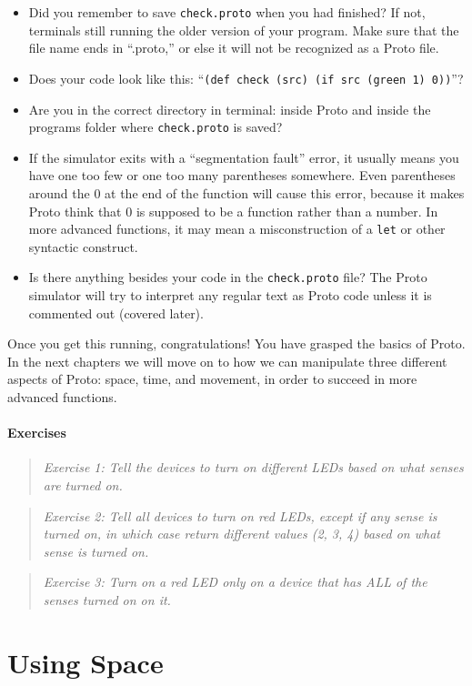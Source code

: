 \documentclass{article}
\newcommand\problem[1]{\begin{quote}{\em #1}\end{quote}}
\newcommand\var[1]{{\tt #1}}
\newcommand\qvar[1]{``{\tt #1}''}
\begin{document}
\begin{itemize}
\item Did you remember to save \var{check.proto} when you had
  finished? If not, terminals still running the older version of your
  program. Make sure that the file name ends in ``.proto,'' or else it
  will not be recognized as a Proto file.
\item Does your code look like this: \qvar{(def check (src) (if src
    (green 1) 0))}?
\item Are you in the correct directory in terminal: inside Proto and
  inside the programs folder where \var{check.proto} is saved?
\item If the simulator exits with a ``segmentation fault'' error, it
  usually means you have one too few or one too many parentheses
  somewhere.  Even parentheses around the 0 at the end of the function
  will cause this error, because it makes Proto think that 0 is
  supposed to be a function rather than a number.  In more advanced
  functions, it may mean a misconstruction of a \var{let} or other
  syntactic construct.
\item Is there anything besides your code in the \var{check.proto}
  file? The Proto simulator will try to interpret any regular text as
  Proto code unless it is commented out (covered later).
\end{itemize}

Once you get this running, congratulations! You have grasped the
basics of Proto. In the next chapters we will move on to how we can
manipulate three different aspects of Proto: space, time, and
movement, in order to succeed in more advanced functions.

\paragraph{Exercises}

\problem{Exercise 1: Tell the devices to turn on different LEDs based
  on what senses are turned on.}

\problem{Exercise 2: Tell all devices to turn on red LEDs, except if
  any sense is turned on, in which case return different values (2, 3,
  4) based on what sense is turned on.}

\problem{Exercise 3: Turn on a red LED only on a device that has ALL
  of the senses turned on on it.}


\section{Using Space}
\label{s:space}
\end{document}
